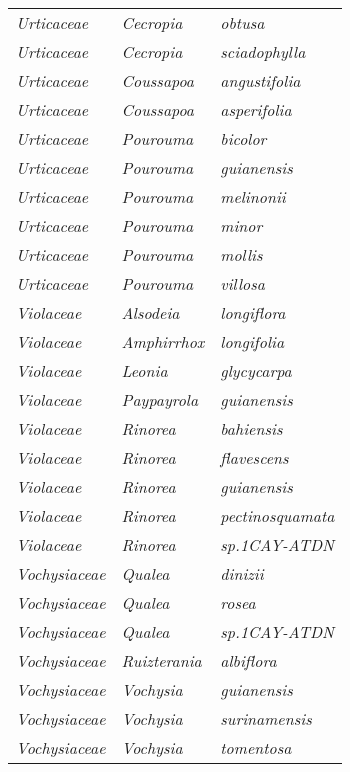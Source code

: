 \documentclass[fleqn,10pt]{ArtEcoFoG} %
\renewenvironment{table}{\begin{table*}}{\end{table*}\ignorespacesafterend}
\begin{document}
\begin{table}
\begin{tabular}[t]{lll}
\em{Urticaceae} & \em{Cecropia} & \em{obtusa}\\
\em{Urticaceae} & \em{Cecropia} & \em{sciadophylla}\\
\em{Urticaceae} & \em{Coussapoa} & \em{angustifolia}\\
\addlinespace
\em{Urticaceae} & \em{Coussapoa} & \em{asperifolia}\\
\em{Urticaceae} & \em{Pourouma} & \em{bicolor}\\
\em{Urticaceae} & \em{Pourouma} & \em{guianensis}\\
\em{Urticaceae} & \em{Pourouma} & \em{melinonii}\\
\em{Urticaceae} & \em{Pourouma} & \em{minor}\\
\addlinespace
\em{Urticaceae} & \em{Pourouma} & \em{mollis}\\
\em{Urticaceae} & \em{Pourouma} & \em{villosa}\\
\em{Violaceae} & \em{Alsodeia} & \em{longiflora}\\
\em{Violaceae} & \em{Amphirrhox} & \em{longifolia}\\
\em{Violaceae} & \em{Leonia} & \em{glycycarpa}\\
\addlinespace
\em{Violaceae} & \em{Paypayrola} & \em{guianensis}\\
\em{Violaceae} & \em{Rinorea} & \em{bahiensis}\\
\em{Violaceae} & \em{Rinorea} & \em{flavescens}\\
\em{Violaceae} & \em{Rinorea} & \em{guianensis}\\
\em{Violaceae} & \em{Rinorea} & \em{pectinosquamata}\\
\addlinespace
\em{Violaceae} & \em{Rinorea} & \em{sp.1CAY-ATDN}\\
\em{Vochysiaceae} & \em{Qualea} & \em{dinizii}\\
\em{Vochysiaceae} & \em{Qualea} & \em{rosea}\\
\em{Vochysiaceae} & \em{Qualea} & \em{sp.1CAY-ATDN}\\
\em{Vochysiaceae} & \em{Ruizterania} & \em{albiflora}\\
\addlinespace
\em{Vochysiaceae} & \em{Vochysia} & \em{guianensis}\\
\em{Vochysiaceae} & \em{Vochysia} & \em{surinamensis}\\
\em{Vochysiaceae} & \em{Vochysia} & \em{tomentosa}\\
\bottomrule
\end{tabular}
\end{table}



\makeatletter

\makeatother


\end{document}
